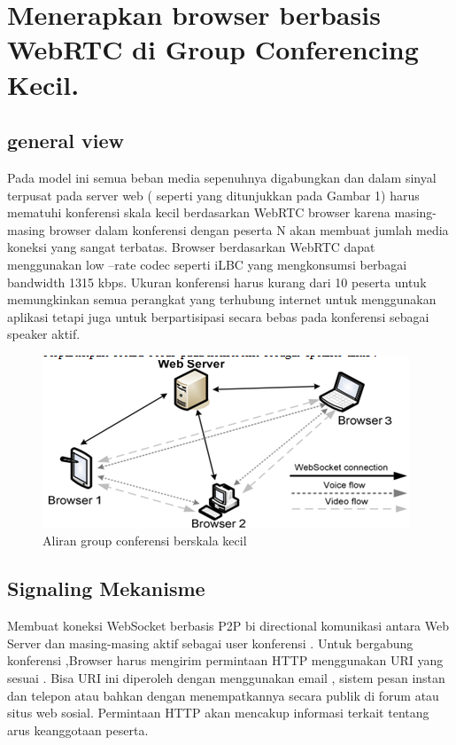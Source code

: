 \documentclass{jtetiproposalskripsi}
\begin{document}
\section{Menerapkan browser berbasis WebRTC di Group Conferencing Kecil.}
\subsection{general view}
Pada model ini semua beban media sepenuhnya digabungkan dan dalam sinyal terpusat pada server web ( seperti yang ditunjukkan pada Gambar 1) harus mematuhi konferensi skala kecil berdasarkan WebRTC browser karena masing-masing browser dalam konferensi dengan peserta N akan membuat jumlah media koneksi yang sangat terbatas. Browser berdasarkan WebRTC dapat menggunakan low –rate codec seperti iLBC yang mengkonsumsi berbagai bandwidth 1315 kbps. Ukuran konferensi harus kurang dari 10 peserta untuk memungkinkan semua perangkat yang terhubung internet untuk menggunakan aplikasi tetapi juga untuk berpartisipasi secara bebas pada konferensi sebagai speaker aktif.

\begin{figure}[ht!]
  \centering
    \includegraphics{gambar/web}
    \caption{ Aliran group conferensi berskala kecil}
    \label{wsn}
\end{figure}

\subsection{Signaling Mekanisme}

Membuat koneksi WebSocket berbasis P2P bi directional komunikasi antara Web Server dan masing-masing aktif sebagai user konferensi . Untuk bergabung konferensi ,Browser harus mengirim permintaan HTTP menggunakan URI yang sesuai . Bisa URI ini diperoleh dengan menggunakan email , sistem pesan instan dan telepon atau bahkan dengan menempatkannya secara publik di forum atau situs web sosial. Permintaan HTTP akan mencakup informasi terkait tentang arus keanggotaan peserta.
\end{document}
